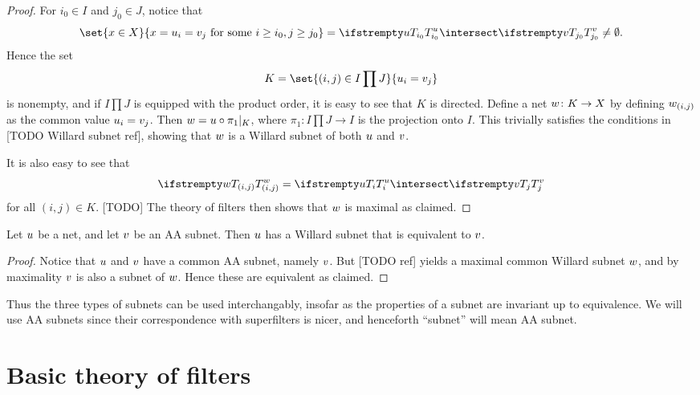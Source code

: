 \documentclass[article, a4paper, 11pt, oneside]{memoir}
\numberwithin{equation}{chapter}
\theoremstyle{nonumberplain}
\begin{document}
\begin{proof}
    For $i_0 \in I$ and $j_0 \in J$, notice that
    \begin{equation*}
        \set{x \in X}{x = \mynet_i = \altnet_j \text{ for some } i \geq i_0, j \geq j_0}
            = \tail[\mynet]{i_0} \intersect \tail[\altnet]{j_0}
            \neq \emptyset.
    \end{equation*}
    Hence the set
    \begin{equation*}
        K
            = \set{(i,j) \in I \prod J}{\mynet_i = \altnet_j}
    \end{equation*}
    is nonempty, and if $I \prod J$ is equipped with the product order, it is easy to see that $K$ is directed. Define a net $w \colon K \to X$ by defining $w_{(i,j)}$ as the common value $u_i = v_j$. Then $w = u \circ \pi_1|_K$, where $\pi_1 \colon I \prod J \to I$ is the projection onto $I$. This trivially satisfies the conditions in [TODO Willard subnet ref], showing that $w$ is a Willard subnet of both $u$ and $v$.
    
    It is also easy to see that
    \begin{equation*}
        \tail[\newnet]{(i,j)}
            = \tail[\mynet]{i} \intersect \tail[\altnet]{j}
    \end{equation*}
    for all $(i,j) \in K$. [TODO] The theory of filters then shows that $w$ is maximal as claimed.
\end{proof}


\begin{corollary}
    Let $u$ be a net, and let $v$ be an AA subnet. Then $u$ has a Willard subnet that is equivalent to $v$.
\end{corollary}

\begin{proof}
    Notice that $u$ and $v$ have a common AA subnet, namely $v$. But [TODO ref] yields a maximal common Willard subnet $w$, and by maximality $v$ is also a subnet of $w$. Hence these are equivalent as claimed.
\end{proof}
%
Thus the three types of subnets can be used interchangably, insofar as the properties of a subnet are invariant up to equivalence. We will use AA subnets since their correspondence with superfilters is nicer, and henceforth \enquote{subnet} will mean AA subnet.



\chapter{Basic theory of filters}
\end{document}
